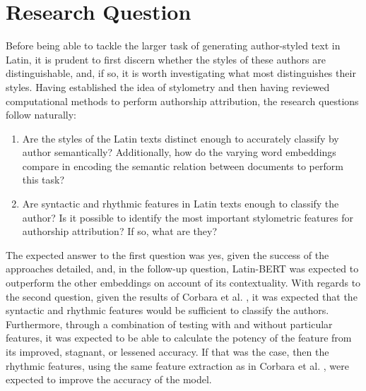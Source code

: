 \documentclass{csfourzero}
\begin{document}
\section{Research Question}
\label{sec:rq}

Before being able to tackle the larger task of generating author-styled text in Latin, it is prudent to first discern whether the styles of these authors are distinguishable, and, if so, it is worth investigating what most distinguishes their styles. Having established the idea of stylometry and then having reviewed computational methods to perform authorship attribution, the research questions follow naturally:
\begin{enumerate}
    \item Are the styles of the Latin texts distinct enough to accurately classify by author semantically? Additionally, how do the varying word embeddings compare in encoding the semantic relation between documents to perform this task?
    \item Are syntactic and rhythmic features in Latin texts enough to classify the author? Is it possible to identify the most important stylometric features for authorship attribution? If so, what are they?
\end{enumerate}
The expected answer to the first question was yes, given the success of the approaches detailed, and, in the follow-up question, Latin-BERT was expected to outperform the other embeddings on account of its contextuality. With regards to the second question, given the results of Corbara et al. \cite{SyllabicQuantity}, it was expected that the syntactic and rhythmic features would be sufficient to classify the authors. Furthermore, through a combination of testing with and without particular features, it was expected to be able to calculate the potency of the feature from its improved, stagnant, or lessened accuracy. If that was the case, then the rhythmic features, using the same feature extraction as in Corbara et al. \cite{SyllabicQuantity}, were expected to improve the accuracy of the model. 
\end{document}

